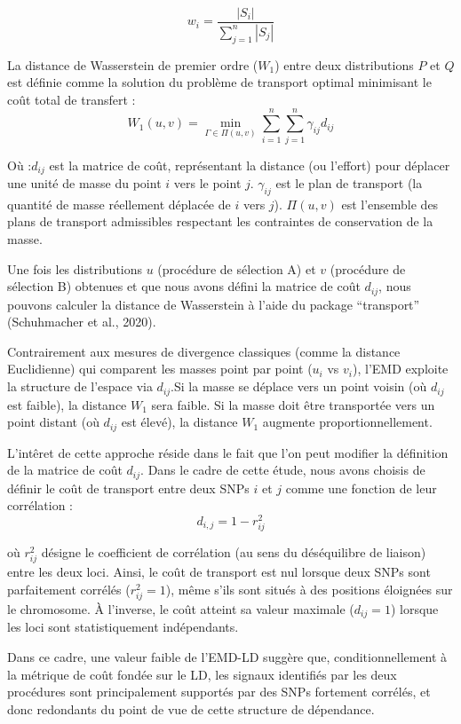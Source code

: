 \documentclass[
  11pt,
  letterpaper,
  DIV=11,
  numbers=noendperiod]{scrartcl}
\begin{document}
\[w_i = \frac{|S_i|}{\sum_{j=1}^{n} |S_j|}\]

La distance de Wasserstein de premier ordre (\(W_1\)) entre deux
distributions \(P\) et \(Q\) est définie comme la solution du problème
de transport optimal minimisant le coût total de transfert :
\[W_1(u, v) = \min_{\Gamma \in \Pi(u, v)} \sum_{i=1}^{n} \sum_{j=1}^{n} \gamma_{ij} d_{ij}\]

Où :\(d_{ij}\) est la matrice de coût, représentant la distance (ou
l'effort) pour déplacer une unité de masse du point \(i\) vers le point
\(j\). \(\gamma_{ij}\) est le plan de transport (la quantité de masse
réellement déplacée de \(i\) vers \(j\)). \(\Pi(u, v)\) est l'ensemble
des plans de transport admissibles respectant les contraintes de
conservation de la masse.

Une fois les distributions \(u\) (procédure de sélection A) et \(v\)
(procédure de sélection B) obtenues et que nous avons défini la matrice
de coût \(d_{ij}\), nous pouvons calculer la distance de Wasserstein à
l'aide du package ``transport'' (Schuhmacher et al., 2020).

Contrairement aux mesures de divergence classiques (comme la distance
Euclidienne) qui comparent les masses point par point (\(u_i\) vs
\(v_i\)), l'EMD exploite la structure de l'espace via \(d_{ij}\).Si la
masse se déplace vers un point voisin (où \(d_{ij}\) est faible), la
distance \(W_1\) sera faible. Si la masse doit être transportée vers un
point distant (où \(d_{ij}\) est élevé), la distance \(W_1\) augmente
proportionnellement.

L'intêret de cette approche réside dans le fait que l'on peut modifier
la définition de la matrice de coût \(d_{ij}\). Dans le cadre de cette
étude, nous avons choisis de définir le coût de transport entre deux
SNPs \(i\) et \(j\) comme une fonction de leur corrélation :
\[d_{i,j} = 1 - r^2_{ij}\]

où \(r^2_{ij}\) désigne le coefficient de corrélation (au sens du
déséquilibre de liaison) entre les deux loci. Ainsi, le coût de
transport est nul lorsque deux SNPs sont parfaitement corrélés
(\(r^2_{ij} = 1\)), même s'ils sont situés à des positions éloignées sur
le chromosome. À l'inverse, le coût atteint sa valeur maximale
(\(d_{ij} = 1\)) lorsque les loci sont statistiquement indépendants.

Dans ce cadre, une valeur faible de l'EMD-LD suggère que,
conditionnellement à la métrique de coût fondée sur le LD, les signaux
identifiés par les deux procédures sont principalement supportés par des
SNPs fortement corrélés, et donc redondants du point de vue de cette
structure de dépendance.
\end{document}
